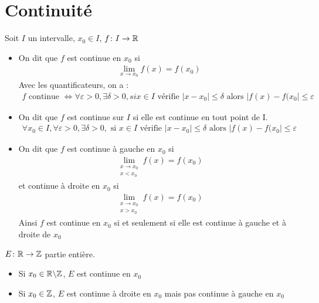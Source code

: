 \section{Continuité}
\begin{graybox}
\begin{definition}
Soit $I$ un intervalle, $x_0 \in I$, $f \colon I \to \mathbb{R}$
\begin{itemize}
\item On dit que $f$ est continue en $x_0$ si 
\begin{align*}
\lim_{x \to x_0} f(x) = f(x_0)
\end{align*}
Avec les quantificateurs, on a :
\begin{align*}
f \text{ continue } \iff \forall \varepsilon > 0, \exists \delta > 0, si x \in I \text{ vérifie } |x - x_0 | \leq \delta \text{ alors } |f(x) - f(x_0| \leq \varepsilon
\end{align*}
\item On dit que $f$ est continue sur $I$ si elle est continue en tout point de I.
\begin{align*}
\forall x_0 \in I, \forall \varepsilon > 0, \exists \delta > 0, \text{ si } x \in I \text{ vérifie } |x - x_0| \leq \delta \text{ alors } |f(x) - f(x_0| \leq \varepsilon
\end{align*}
\item On dit que $f$ est continue à gauche en $x_0$ si 
\begin{align*}
\lim_{\substack{x \to x_0 \\ x < x_0}} f(x) = f(x_0)
\end{align*}
et continue à droite en $x_0$ si
\begin{align*}
\lim_{\substack{x \to x_0 \\ x > x_0}} f(x) = f(x_0)
\end{align*}
Ainsi $f$ est continue en $x_0$ si et seulement si elle est continue à gauche et à droite de $x_0$
\end{itemize}
\end{definition} 
\end{graybox}

\begin{exemple}
$E \colon \mathbb{R} \to \mathbb{Z}$ partie entière.
\begin{itemize}
\item Si $x_0 \in \mathbb{R} \backslash \mathbb{Z}$, $E$ est continue en $x_0$
\item Si $x_0 \in \mathbb{Z}$, $E$ est continue à droite en $x_0$ mais pas continue à gauche en $x_0$
\end{itemize}
\end{exemple}

